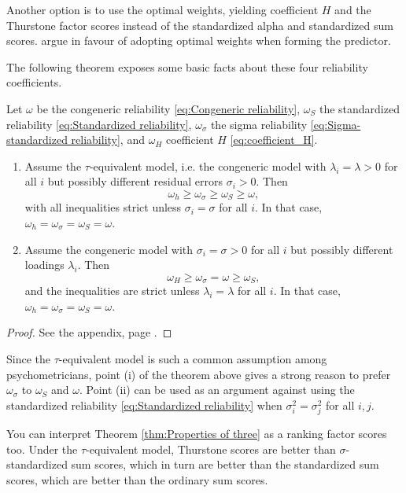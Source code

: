 \documentclass[twoside]{article}
\begin{document}
Another option is to use the optimal weights, yielding coefficient $H$ and the Thurstone factor scores instead of the standardized alpha and standardized sum scores.  \citet{McNeish2019-ea} argue in favour of adopting optimal weights when forming the predictor. 

The following theorem exposes some basic facts about these four reliability coefficients.

\begin{thm}
\label{thm:Properties of three} Let $\omega$ be the congeneric
reliability \eqref{eq:Congeneric reliability}, $\omega_{S}$ the standardized reliability \eqref{eq:Standardized reliability},
$\omega_{\sigma}$ the sigma reliability \eqref{eq:Sigma-standardized reliability},
and $\omega_{H}$ coefficient $H$ \eqref{eq:coefficient_H}. 

\begin{enumerate}[label=(\roman*)]
\item Assume the $\tau$-equivalent model,
i.e. the congeneric model with $\lambda_{i}=\lambda>0$ for all $i$
but possibly different residual errors $\sigma_{i}>0$. Then
\[
\omega_{h}\geq\omega_{\sigma}\geq\omega_{S}\geq\omega,
\]
with all inequalities strict unless $\sigma_{i}=\sigma$ for all
$i$. In that case, $\omega_{h} = \omega_{\sigma} = \omega_{S} = \omega$.
\item Assume the congeneric model with $\sigma_i = \sigma > 0$ for all $i$ but possibly different loadings $\lambda_i$. Then
\[
\omega_{H}\geq\omega_{\sigma}=\omega\geq\omega_{S},
\]
and the inequalities are strict unless $\lambda_{i}=\lambda$ for all
$i$. In that case, $\omega_{h} = \omega_{\sigma} = \omega_{S} = \omega$.

\end{enumerate}

\end{thm}
\begin{proof}
See the appendix, page \pageref{proof:Properties}.
\end{proof}

Since the $\tau$-equivalent model is such a common assumption among psychometricians, point (i) of the theorem above gives a strong reason to prefer $\omega_{\sigma}$ to $\omega_S$ and $\omega$. Point (ii) can be used as an argument against using the standardized reliability \eqref{eq:Standardized reliability} when $\sigma_{i}^{2}=\sigma_j^{2}$ for all $i,j$.

You can interpret Theorem \ref{thm:Properties of three} as a ranking factor scores too. Under the $\tau$-equivalent model, Thurstone scores are better than $\sigma$-standardized sum scores, which in turn are better than the standardized sum scores, which are
better than the ordinary sum scores.
\end{document}

